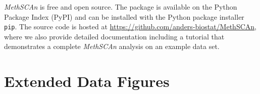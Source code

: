 \documentclass[10pt]{article}
\begin{document}
\textit{MethSCAn} is free and open source.
The package is available on the Python Package Index (PyPI) and can be installed with the Python package installer \texttt{pip}.
The source code is hosted at \href{https://github.com/anders-biostat/MethSCAn}{https://github.com/anders-biostat/MethSCAn}, where we also provide detailed documentation including a tutorial that demonstrates a complete \textit{MethSCAn} analysis on an example data set.


{
\small \balance  \balance}

\onecolumn 
\newpage
\section*{Extended Data Figures}
\vspace{1.5cm}

\setcounter{figure}{0}
\renewcommand{\figurename}{Extended Data Figure} 
\end{document}
